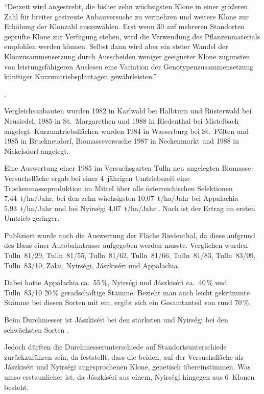 \documentclass[twocolumn]{scrartcl}
\begin{document}
\hypertarget{german:mueller1999robinie}{\enquote{Derzeit wird angestrebt, die bisher zehn wüchsigsten Klone in
  einer größeren Zahl für breiter gestreute Anbauversuche zu vermehren
  und weitere Klone zur Erhöhung der Klonzahl auszuwählen. Erst wenn
  30 auf mehreren Standorten geprüfte Klone zur Verfügung stehen, wird
  die Verwendung des Pflanzenmaterials empfohlen werden können. Selbst
  dann wird aber ein steter Wandel der Klonzusammensetzung durch
  Ausscheiden weniger geeigneter Klone zugunsten von
  leistungsfähigeren Auslesen eine Variation der
  Genotypenzusammensetzung künftiger Kurzumtriebsplantagen
  gewährleisten.}} \citep{mueller1999robinie}.

Vergleichsanbauten wurden 1982 in Karlwald bei Halbturn und Rüsterwald
bei Neusiedel, 1985 in St.~Margarethen und 1988 in Riedenthal bei
Mistelbach angelegt. Kurzumtriebsflächen wurden 1984 in Wasserburg bei
St.~Pölten und 1985 in Bruckneudorf, Biomasseversuche 1987 in
Neckenmarkt und 1988 in Nickelsdorf angelegt.

Eine Auswertung einer 1985 im Versuchsgarten Tulln neu angelegten
Biomasse--Versuchsfläche ergab bei einer 4~jährigen Umtriebszeit eine
Trockenmasseproduktion im Mittel über alle österreichischen
Selektionen 7,44~t/ha/Jahr, bei den zehn wüchsigsten 10,07~t/ha/Jahr
bei Appalachia 5,93~t/ha/Jahr und bei Nyirségi 4,07~t/ha/Jahr
\citep{mueller1991robinie}. Nach \citet{redei2005robinieEnergieholz}
ist der Ertrag im ersten Umtrieb geringer.

Publiziert wurde auch die Auswertung der Fläche Riedenthal, da diese
aufgrund des Baus einer Autobahntrasse aufgegeben werden
musste. Verglichen wurden Tulln~81/29, Tulln~81/55, Tulln~81/62,
Tulln~81/66, Tulln~81/83, Tulln~83/09, Tulln~83/10, Zalai, Nyirségi,
Jászkiséri und Appalachia.

Dabei hatte Appalachia ca.\ 55\,\%, Nyirségi und Jászkiséri
ca.\ 40\,\% und Tulln~83/10 20\,\% geradschaftige Stämme.  Bezieht man
auch leicht gekrümmte Stämme bei diesen Sorten mit ein, ergibt sich
ein Gesamtanteil von rund 70\,\%.

Beim Durchmesser ist Jászkiséri bei den stärksten und Nyirségi bei den
schwächsten Sorten \citep{schueler2006robinie}.

Jedoch dürften die Durchmesserunterschiede auf Standortsunterschiede
zurückzuführen sein, da \citet{heinze2014robinie} feststellt, dass die
beiden, auf der Versuchsfläche als Jászkiséri und Nyirségi
angesprochenen Klone, genetisch übereinstimmen. Was umso erstaunlicher
ist, da Jászkiséri aus einem, Nyirségi hingegen aus 6~Klonen besteht.
\end{document}
